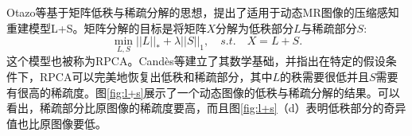 Otazo等基于矩阵低秩与稀疏分解的思想，提出了适用于动态MR图像的压缩感知重建模型L+S\cite{lpluss}。矩阵分解的目标是将矩阵$X$分解为低秩部分$L$与稀疏部分$S$:
\begin{equation}
	\min_{L,S}||L||_*+\lambda||S||_1, \quad s.t. \quad X=L+S.
\end{equation}
这个模型也被称为RPCA。Candès等\cite{rpca}建立了其数学基础，并指出在特定的假设条件下，RPCA可以完美地恢复出低秩和稀疏部分，其中$L$的秩需要很低并且$S$需要有很高的稀疏度。图\ref{fig:l+s}展示了一个动态图像的低秩与稀疏分解的结果。可以看出，稀疏部分比原图像的稀疏度要高，而且图\ref{fig:l+s}（d）表明低秩部分的奇异值也比原图像要低。
\begin{figure}[htbp]
\centering
{}


\end{figure}
